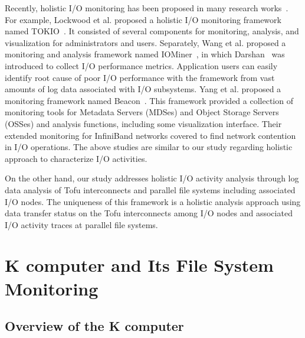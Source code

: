 \documentclass{jhps}
\begin{document}
Recently, holistic I/O monitoring has been proposed
in many research works~\cite{lockwood:cug18,wang:cluster18,yang:nsdi2019}.
For example, Lockwood et al. proposed a holistic I/O monitoring framework
named TOKIO~\cite{lockwood:cug18}.
It consisted of several components for monitoring, analysis, and visualization
for administrators and users.
Separately, Wang et al. proposed a monitoring and analysis framework
named IOMiner~\cite{wang:cluster18}, in which Darshan~\cite{darshan:web}
was introduced to collect I/O performance metrics.
Application users can easily identify root cause of
poor I/O performance with the framework from vast amounts of log data
associated with I/O subsystems.
Yang et al. proposed a monitoring framework named Beacon~\cite{yang:nsdi2019}.
This framework provided a collection of monitoring tools for Metadata Servers (MDSes)
and Object Storage Servers (OSSes) and analysis functions,
including some visualization interface.
Their extended monitoring for InfiniBand networks covered to
find network contention in I/O operations.
The above studies are similar to our study regarding holistic approach
to characterize I/O activities.

On the other hand, our study addresses holistic I/O activity analysis
through log data analysis of Tofu interconnects and parallel file systems
including associated I/O nodes.
The uniqueness of this framework is a holistic analysis approach
using data transfer status on the Tofu interconnects among I/O nodes
and associated I/O activity traces at parallel file systems.

\section{K computer and Its File System Monitoring}
\label{sec:K_COMP}

\subsection{Overview of the K computer}
\label{ssec:K_COMP_OVERVIEW}
\end{document}
